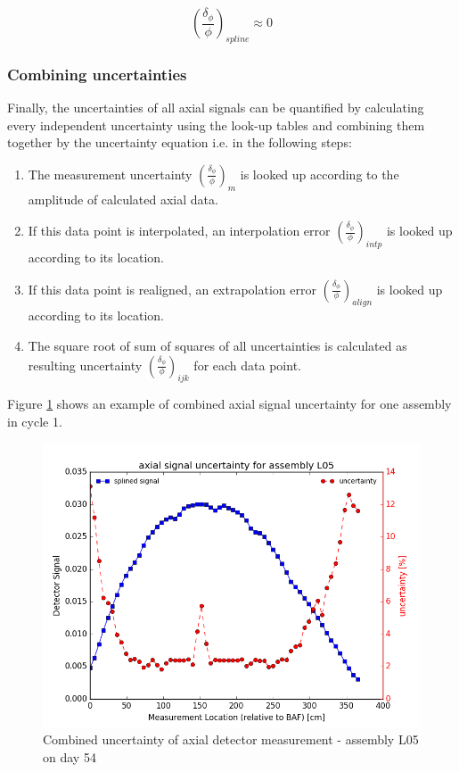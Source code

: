 \documentclass{article}
\begin{document}
\begin{equation}
\label{eq:spline_error}
  \left(\frac{\delta_\phi}{\phi}\right)_{spline} \approx 0
\end{equation}

\subsubsection{Combining uncertainties}
Finally, the uncertainties of all axial signals can be quantified by calculating every independent uncertainty using the look-up tables and combining them together by the uncertainty equation i.e. in the following steps:

\begin{enumerate}
\item The measurement uncertainty $\left(\frac{\delta_\phi}{\phi}\right)_{m}$ is looked up according to the amplitude of calculated axial data.
\item If this data point is interpolated, an interpolation error $\left(\frac{\delta_\phi}{\phi}\right)_{intp}$ is looked up according to its location.
\item If this data point is realigned, an extrapolation error $\left(\frac{\delta_\phi}{\phi}\right)_{align}$ is looked up according to its location.
\item The square root of sum of squares of all uncertainties is calculated as resulting uncertainty $\left(\frac{\delta_\phi}{\phi}\right)_{ijk}$ for each data point.
\end{enumerate}

Figure \ref{fig:fig_combined_error} shows an example of combined axial signal uncertainty for one assembly in cycle 1.

\begin{figure}[ht]
\centering
\includegraphics[keepaspectratio, width = 4.0 in]{figures/flux_map_uncertainties/combined_error.png}
\caption{Combined uncertainty of axial detector measurement - assembly L05 on day 54}
\label{fig:fig_combined_error}
\end{figure}
\end{document}
